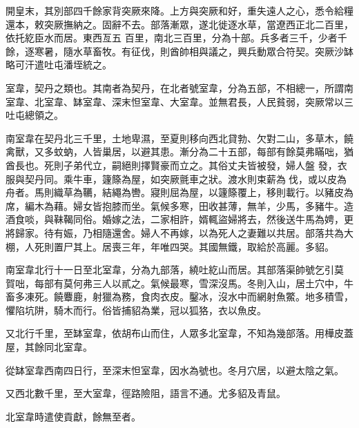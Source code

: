 \begin{pinyinscope}
 開皇末，其別部四千餘家背突厥來降。上方與突厥和好，重失遠人之心，悉令給糧還本，敕突厥撫納之。固辭不去。部落漸眾，遂北徙逐水草，當遼西正北二百里，依托紇臣水而居。東西亙五
 百里，南北三百里，分為十部。兵多者三千，少者千餘，逐寒暑，隨水草畜牧。有征伐，則酋帥相與議之，興兵動眾合符契。突厥沙缽略可汗遣吐屯潘垤統之。



 室韋，契丹之類也。其南者為契丹，在北者號室韋，分為五部，不相總一，所謂南室韋、北室韋、缽室韋、深末怛室韋、大室韋。並無君長，人民貧弱，突厥常以三吐屯總領之。



 南室韋在契丹北三千里，土地卑濕，至夏則移向西北貸勃、欠對二山，多草木，饒禽獸，又多蚊蚋，人皆巢居，以避其患。漸分為二十五部，每部有餘莫弗瞞咄，猶酋長也。死則子弟代立，嗣絕則擇賢豪而立之。其俗丈夫皆被發，婦人盤
 發，衣服與契丹同。乘牛車，籧篨為屋，如突厥氈車之狀。渡水則束薪為伐，或以皮為舟者。馬則織草為韉，結繩為轡。寢則屈為屋，以籧篨覆上，移則載行。以豬皮為席，編木為藉。婦女皆抱膝而坐。氣候多寒，田收甚薄，無羊，少馬，多豬牛。造酒食啖，與靺鞨同俗。婚嫁之法，二家相許，婿輒盜婦將去，然後送牛馬為娉，更將歸家。待有娠，乃相隨還舍。婦人不再嫁，以為死人之妻難以共居。部落共為大棚，人死則置尸其上。居喪三年，年唯四哭。其國無鐵，取給於高麗。多貂。



 南室韋北行十一日至北室韋，分為九部落，繞吐紇山而居。其部落渠帥號乞引莫
 賀咄，每部有莫何弗三人以貳之。氣候最寒，雪深沒馬。冬則入山，居土穴中，牛畜多凍死。饒麞鹿，射獵為務，食肉衣皮。鑿冰，沒水中而網射魚鱉。地多積雪，懼陷坑阱，騎木而行。俗皆捕貂為業，冠以狐狢，衣以魚皮。



 又北行千里，至缽室韋，依胡布山而住，人眾多北室韋，不知為幾部落。用樺皮蓋屋，其餘同北室韋。



 從缽室韋西南四日行，至深末怛室韋，因水為號也。冬月穴居，以避太陰之氣。



 又西北數千里，至大室韋，徑路險阻，語言不通。尤多貂及青鼠。



 北室韋時遣使貢獻，餘無至者。




\end{pinyinscope}
